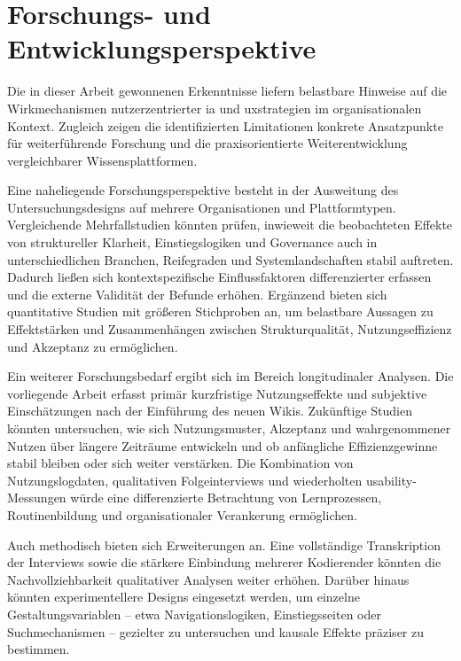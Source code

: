 \section{Forschungs- und Entwicklungsperspektive}
\label{sec:08-03_future-research}

Die in dieser Arbeit gewonnenen Erkenntnisse liefern belastbare Hinweise auf die Wirkmechanismen nutzerzentrierter \Gls{ia} und \Gls{uxstrategien} im organisationalen Kontext. Zugleich zeigen die identifizierten Limitationen konkrete Ansatzpunkte für weiterführende Forschung und die praxisorientierte Weiterentwicklung vergleichbarer Wissensplattformen.

Eine naheliegende Forschungsperspektive besteht in der Ausweitung des Untersuchungsdesigns auf mehrere Organisationen und Plattformtypen. Vergleichende Mehrfallstudien könnten prüfen, inwieweit die beobachteten Effekte von struktureller Klarheit, Einstiegslogiken und Governance auch in unterschiedlichen Branchen, Reifegraden und Systemlandschaften stabil auftreten. Dadurch ließen sich kontextspezifische Einflussfaktoren differenzierter erfassen und die externe Validität der Befunde erhöhen. Ergänzend bieten sich quantitative Studien mit größeren Stichproben an, um belastbare Aussagen zu Effektstärken und Zusammenhängen zwischen Strukturqualität, Nutzungseffizienz und Akzeptanz zu ermöglichen.

Ein weiterer Forschungsbedarf ergibt sich im Bereich longitudinaler Analysen. Die vorliegende Arbeit erfasst primär kurzfristige Nutzungseffekte und subjektive Einschätzungen nach der Einführung des neuen Wikis. Zukünftige Studien könnten untersuchen, wie sich Nutzungsmuster, Akzeptanz und wahrgenommener Nutzen über längere Zeiträume entwickeln und ob anfängliche Effizienzgewinne stabil bleiben oder sich weiter verstärken. Die Kombination von Nutzungslogdaten, qualitativen Folgeinterviews und wiederholten \Gls{usability}-Messungen würde eine differenzierte Betrachtung von Lernprozessen, Routinenbildung und organisationaler Verankerung ermöglichen.

Auch methodisch bieten sich Erweiterungen an. Eine vollständige Transkription der Interviews sowie die stärkere Einbindung mehrerer Kodierender könnten die Nachvollziehbarkeit qualitativer Analysen weiter erhöhen. Darüber hinaus könnten experimentellere Designs eingesetzt werden, um einzelne Gestaltungsvariablen -- etwa Navigationslogiken, Einstiegsseiten oder Suchmechanismen -- gezielter zu untersuchen und kausale Effekte präziser zu bestimmen.

